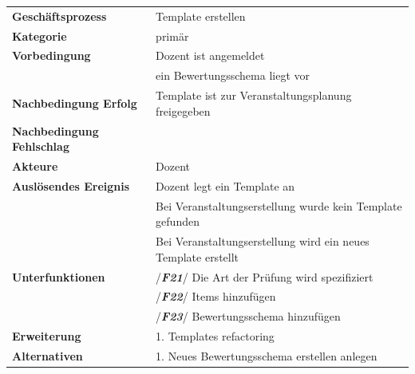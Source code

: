 		\begin{table}[H]
		\begin{tabular}{|ll}
			\rowcolor{hellgrau}\multicolumn{2}{l}{/\textbf{\textit{F20}}/}\\\hline
			 \textbf{Geschäftsprozess} & Template erstellen \\ 
			 \textbf{Kategorie} & primär \\ 
			 \textbf{Vorbedingung} & Dozent ist angemeldet\\
			 & ein Bewertungsschema liegt vor \\ 

			 \textbf{Nachbedingung Erfolg} & Template ist
			  zur Veranstaltungsplanung freigegeben  \\ 
			 \textbf{Nachbedingung Fehlschlag} &  \\ 
			 \textbf{Akteure} & Dozent \\ 
			 \textbf{Auslösendes Ereignis} & Dozent legt ein Template an \\
			 & Bei Veranstaltungserstellung wurde kein Template gefunden\\
			 & Bei Veranstaltungserstellung wird ein neues Template erstellt\\
			 \textbf{Unterfunktionen} & /\textbf{\textit{F21}}/ Die Art der Prüfung wird spezifiziert \\
			 &  /\textbf{\textit{F22}}/ Items hinzufügen\\
			 & /\textbf{\textit{F23}}/ Bewertungsschema hinzufügen\\
			  \textbf{Erweiterung} & 1. Templates refactoring \\ 
			 \textbf{Alternativen} & 1. Neues Bewertungsschema erstellen anlegen \\  			
			 \end{tabular} 
		\label{tab:F20}
		\end{table}
	
